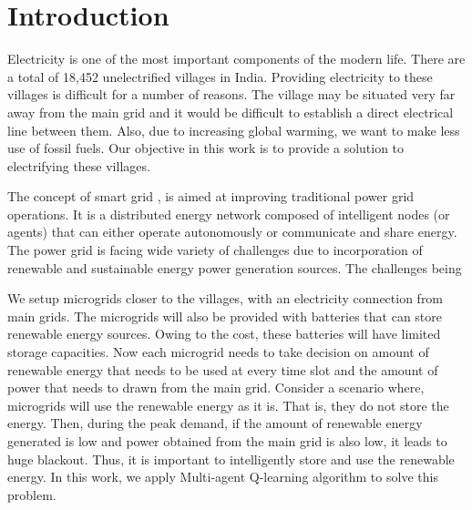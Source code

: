 \documentclass[conference]{IEEEtran}
\begin{document}




%
\IEEEpeerreviewmaketitle



\section{Introduction}

Electricity is one of the most important components of the modern life. There are a total of 18,452 unelectrified villages in India. Providing electricity to these villages is difficult for a number of reasons. The village may be situated very far away from the main grid and it would be difficult to establish a direct electrical line between them. Also, due to increasing global warming, we want to make less use of fossil fuels. Our objective in this work is to provide a solution to electrifying these villages.


The concept of smart grid \cite{weiss1999multiagent}, is aimed at improving traditional power grid operations.  It is a distributed energy network composed of intelligent nodes (or agents) that can either operate autonomously or communicate and share energy. The  power grid is facing wide variety of challenges due to incorporation of renewable and sustainable energy power generation sources. The challenges being 


We setup microgrids closer to the villages, with an electricity connection from main grids. The microgrids will also be provided with batteries that can store renewable energy sources. Owing to the cost, these batteries will have limited storage capacities. Now each microgrid needs to take decision on amount of renewable energy that needs to be used at every time slot and the amount of power that needs to drawn from the main grid. Consider a scenario where, microgrids will use the renewable energy as it is. That is, they do not store the energy. Then, during the peak demand, if the amount of renewable energy generated is low and power obtained from the main grid is also low, it leads to huge blackout. Thus, it is important to intelligently store and use the renewable energy. In this work, we apply Multi-agent Q-learning algorithm to solve this problem. 
\end{document}

